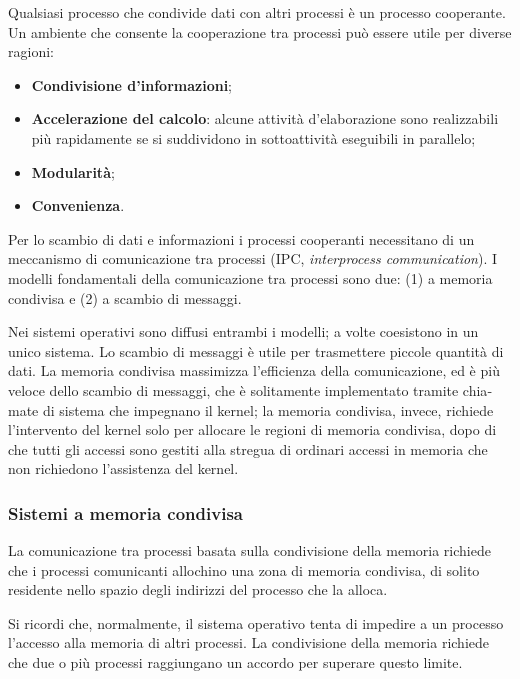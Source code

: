\documentclass[11pt,a4paper]{article}
\begin{document}
Qualsia­si processo che condivide dati con altri processi è un processo cooperante.
Un ambiente che consente la cooperazione tra processi può essere utile per diverse ragioni:
\begin{itemize}[leftmargin=*]
  \item \textbf{Condivisione d'informazioni};
  \item \textbf{Accelerazione del calcolo}: alcune attività d'elaborazione sono realizzabili più rapida­mente se si suddividono in sottoattività eseguibili in parallelo;
  \item \textbf{Modularità};
  \item \textbf{Convenienza}.
\end{itemize}
%
Per lo scambio di dati e informazioni i processi cooperanti necessitano di un meccanismo di
comunicazione tra processi (IPC, \emph{interprocess communication}). I modelli fondamentali della
comunicazione tra processi sono due: (1) a memoria condivisa e (2) a scambio di messag­gi.

Nei sistemi operativi sono diffusi entrambi i modelli; a volte coesistono in un unico si­stema. Lo scambio di messaggi è utile per trasmettere piccole quantità di dati. La memoria condivisa massimizza l'efficienza della comunicazio­ne, ed è più veloce dello scambio di messaggi, che è solitamente implementato tramite chia­mate di sistema che impegnano il kernel; la memoria condivisa, invece, richiede l'intervento
del kernel solo per allocare le regioni di memoria condivisa, dopo di che tutti gli accessi sono
gestiti alla stregua di ordinari accessi in memoria che non richiedono l'assistenza del kernel.

\subsubsection{Sistemi a memoria condivisa}
La comunicazione tra processi basata sulla condivisione della memoria richiede che i pro­cessi comunicanti allochino una zona di memoria condivisa, di solito residente nello spazio
degli indirizzi del processo che la alloca.

Si ricordi che, normalmente, il siste­ma operativo tenta di impedire a un processo l'accesso alla memoria di altri processi. La condivisione della memoria richiede che due o più processi raggiungano un accordo per su­perare questo limite.
\end{document}
